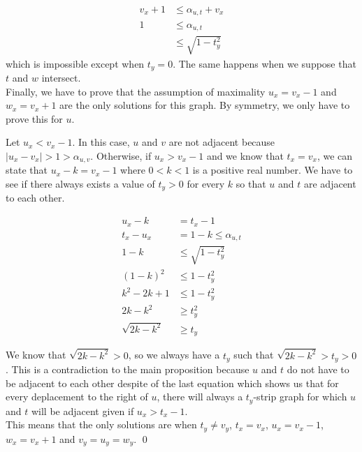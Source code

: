 \documentclass[12pt, letterpaper]{article}
\theoremstyle{definition}
\theoremstyle{remark}
\theoremstyle{plain}
\numberwithin{theorem}{section}
\begin{document}
{\begin{equation*}
  \begin{split}
    v_x+1 & \leq \alpha_{u,t}+v_x\\
    1 & \leq \alpha_{u,t}\\
    & \leq \sqrt{1-t_y^2}
\end{split}
\end{equation*}
which is impossible except when $t_y = 0$. The same happens when we suppose that $t$ and $w$ intersect.\\

Finally, we have to prove that the assumption of maximality $u_x = v_x-1$ and $w_x = v_x+1$ are the only solutions for this graph. By symmetry, we only have to prove this for $u$.

Let $u_x < v_x-1$. In this case, $u$ and $v$ are not adjacent because $|u_x - v_x| > 1 > \alpha_{u,v}$. Otherwise, if $u_x > v_x-1$ and we know that $t_x = v_x$, we can state that $u_x - k = v_x-1$ where $0 < k < 1$ is a positive real number. We have to see if there always exists a value of $t_y > 0$ for every $k$ so that $u$ and $t$ are adjacent to each other.

\begin{equation*}
  \begin{split}
    u_x - k &= t_x - 1\\
    t_x - u_x &= 1 - k \leq \alpha_{u,t}\\
    1 - k &\leq \sqrt{1 - t_y^2}\\
    (1 - k)^2 &\leq 1 - t_y^2\\
    k^2 -2k +1 &\leq 1 - t_y^2\\
    2k-k^2 &\geq t_y^2\\
    \sqrt{2k-k^2} &\geq t_y
  \end{split}
\end{equation*}

We know that $\sqrt{2k-k^2} > 0$, so we always have a $t_y$ such that $\sqrt{2k-k^2} > t_y > 0$. This is a contradiction to the main proposition because $u$ and $t$ do not have to be adjacent to each other despite of the last equation which shows us that for every deplacement to the right of $u$, there will always a $t_y$-strip graph for which $u$ and $t$ will be adjacent given if $u_x > t_x-1$.\\

This means that the only solutions are when $t_y \neq v_y$, $t_x = v_x$, $u_x = v_x-1$, $w_x = v_x+1$ and $v_y = u_y = w_y$. \qed
}
\end{document}
